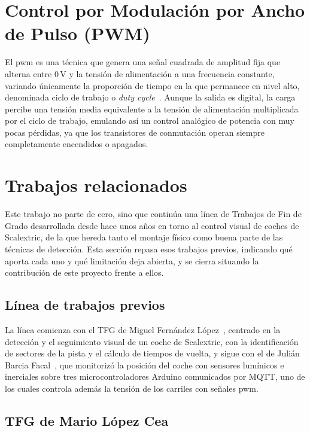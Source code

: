 \section{Control por Modulación por Ancho de Pulso (PWM)}
\label{sec:pwm-fundamentos}

El \gls{pwm} es una técnica que genera una señal cuadrada de amplitud fija que alterna entre 0\,V y la tensión de alimentación a una frecuencia constante, variando únicamente la proporción de tiempo en la que permanece en nivel alto, denominada ciclo de trabajo o \textit{duty cycle}~\cite{arduinopwm}. Aunque la salida es digital, la carga percibe una tensión media equivalente a la tensión de alimentación multiplicada por el ciclo de trabajo, emulando así un control analógico de potencia con muy pocas pérdidas, ya que los transistores de conmutación operan siempre completamente encendidos o apagados.


\section{Trabajos relacionados}
\label{sec:traballos-relacionados}

Este trabajo no parte de cero, sino que continúa una línea de Trabajos de Fin de Grado desarrollada desde hace unos años en torno al control visual de coches de Scalextric, de la que hereda tanto el montaje físico como buena parte de las técnicas de detección. Esta sección repasa esos trabajos previos, indicando qué aporta cada uno y qué limitación deja abierta, y se cierra situando la contribución de este proyecto frente a ellos. 

\subsection{Línea de trabajos previos}

La línea comienza con el TFG de Miguel Fernández López~\cite{fernandezlopez2022}, centrado en la detección y el seguimiento visual de un coche de Scalextric, con la identificación de sectores de la pista y el cálculo de tiempos de vuelta, y sigue con el de Julián Barcia Facal~\cite{barciafacal2023}, que monitorizó la posición del coche con sensores lumínicos e inerciales sobre tres microcontroladores Arduino comunicados por MQTT, uno de los cuales controla además la tensión de los carriles con señales \gls{pwm}.

\subsection{TFG de Mario López Cea}
\label{sec:tfg-mario}

